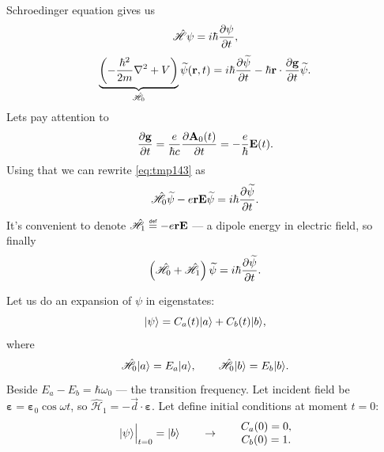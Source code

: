 Schroedinger equation gives us
\begin{equation}
	\hat{\mathscr{H}} \psi = i \hbar \dfrac{\partial {\psi}}{\partial {t}},
\end{equation}
\begin{equation}
	\underbrace{\left( - \frac{\hbar^2}{2m} \nabla^2 + V \right)}_{\hat{\mathscr{H}}_0} \widetilde{\psi} (\mathbf{r},t) = i \hbar \dfrac{\partial {\widetilde{\psi}}}{\partial {t}} - \hbar \mathbf{r} \cdot \dfrac{\partial {\mathbf{g}}}{\partial {t}} \widetilde{\psi}.
	\label{eq:tmp143}
\end{equation} 
Lets pay attention to  
\begin{equation}
	\dfrac{\partial {\mathbf{g}}}{\partial {t}} = \frac{e}{\hbar c} \dfrac{\partial {\mathbf{A}_0(t)}}{\partial {t}} = - \frac{e}{\hbar} \mathbf{E}(t).
\end{equation}
Using that we can rewrite \eqref{eq:tmp143} as
\begin{equation}
	\hat{\mathscr{H}}_0 \widetilde{\psi} - e \mathbf{r} \mathbf{E} \widetilde{\psi} = i \hbar \dfrac{\partial {\widetilde{\psi}}}{\partial {t}}.
\end{equation}
It's convenient to denote $\hat{\mathscr{H}}_1 \myeq - e \vec{r} \vec{E}$ --- a dipole energy in electric field, so finally
\begin{equation}
	\left( \hat{\mathscr{H}}_0 + \hat{\mathscr{H}}_1 \right) \widetilde{\psi} = i \hbar \dfrac{\partial {\widetilde{\psi}}}{\partial {t}}.
\end{equation}

Let us do an expansion of $\psi$ in eigenstates:
\begin{equation}
	\lvert\psi\rangle = C_a(t) \lvert a\rangle + C_b(t) \lvert b\rangle,
\end{equation}
where
\begin{equation}
	\hat{\mathscr{H}}_0 \lvert a\rangle = E_a \lvert a\rangle, \qquad \hat{\mathscr{H}}_0 \lvert b\rangle = E_b \lvert b\rangle.
\end{equation}
Beside $E_a - E_b = \hbar \omega_0$ --- the transition frequency. Let incident field be $\bm{\varepsilon} = \bm{\varepsilon}_0 \cos \omega t$, so $\hat{\mathscr{H}}_1 = - \vec{d} \cdot \bm{\varepsilon}$. Let define initial conditions at moment $t = 0$:
\begin{equation}
	\lvert\psi\rangle \Big|_{t = 0} = \lvert b\rangle \qquad \to \qquad
	\begin{matrix}
		C_a(0) = 0, \\
		C_b(0) = 1.
	\end{matrix}
\end{equation}
